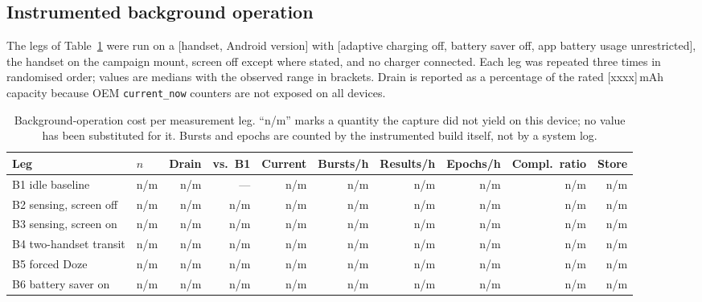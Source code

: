 %
%

\subsection{Instrumented background operation}   %
\label{sec:instrumented}

The legs of Table~\ref{tab:cost} were run on a [handset, Android version] with
[adaptive charging off, battery saver off, app battery usage unrestricted], the handset on the
campaign mount, screen off except where stated, and no charger connected. Each leg was repeated
three times in randomised order; values are medians with the observed range in brackets.
Drain is reported as a percentage of the rated [xxxx]\,mAh capacity because OEM
\texttt{current\_now} counters are not exposed on all devices.

\begin{table}[t]
\centering
\caption{Background-operation cost per measurement leg. ``n/m'' marks a quantity the capture did
not yield on this device; no value has been substituted for it. Bursts and epochs are counted by
the instrumented build itself, not by a system log.}
\label{tab:cost}
\small
\begin{tabular}{llrrrrrrrr}
\toprule
Leg & $n$ & Drain & vs.\ B1 & Current & Bursts/h & Results/h & Epochs/h & Compl.\ ratio & Store \\
\midrule
B1 idle baseline            & n/m & n/m & ---   & n/m & n/m & n/m & n/m & n/m & n/m \\
B2 sensing, screen off      & n/m & n/m & n/m   & n/m & n/m & n/m & n/m & n/m & n/m \\
B3 sensing, screen on       & n/m & n/m & n/m   & n/m & n/m & n/m & n/m & n/m & n/m \\
B4 two-handset transit      & n/m & n/m & n/m   & n/m & n/m & n/m & n/m & n/m & n/m \\
B5 forced Doze              & n/m & n/m & n/m   & n/m & n/m & n/m & n/m & n/m & n/m \\
B6 battery saver on         & n/m & n/m & n/m   & n/m & n/m & n/m & n/m & n/m & n/m \\
\bottomrule
\end{tabular}
\end{table}

